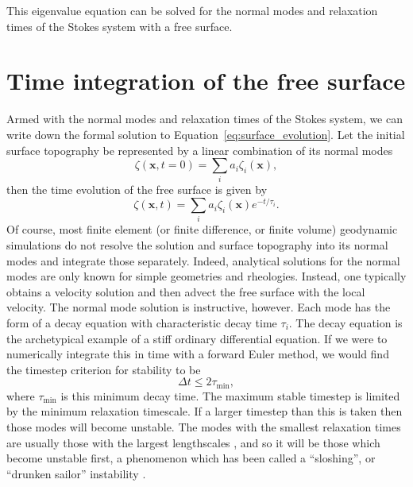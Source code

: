 \documentclass[preprint,12pt,authoryear]{elsarticle}
\begin{document}
This eigenvalue equation can be solved for the normal modes and relaxation times of the Stokes system with 
a free surface.

\section{Time integration of the free surface}
\label{sec:timestepping}

Armed with the normal modes and relaxation times of the Stokes system, we can write down the
formal solution to Equation~\eqref{eq:surface_evolution}. Let the initial surface topography be 
represented by a linear combination of its normal modes
\begin{equation}
\zeta(\mathbf{x}, t=0) = \displaystyle \sum_i a_i \zeta_i(\mathbf{x}),
\end{equation}
then the time evolution of the free surface is given by
\begin{equation}
\zeta( \mathbf{x}, t) = \displaystyle \sum_i a_i \zeta_i(\mathbf{x}) e^{-t/\tau_i}.
\end{equation}
Of course, most finite element (or finite difference, or finite volume) geodynamic simulations do not resolve 
the solution and surface topography into its normal modes and integrate those separately. 
Indeed, analytical solutions for the normal modes are only known for simple geometries and rheologies.
Instead, one typically obtains a velocity solution and then advect the free surface with the local velocity.
The normal mode solution is instructive, however. 
Each mode has the form of a decay equation with characteristic decay time $\tau_i$.
The decay equation is the archetypical example of a stiff ordinary differential equation.
If we were to numerically integrate this in time with a forward Euler method, we would find the 
timestep criterion for stability \citep[e.g.][]{leveque2007finite} to be
\begin{equation}
\Delta t  \le 2 \tau_{\mathrm{min}},
\label{eq:cfl_euler}
\end{equation}
where $\tau_{\mathrm{min}}$ is this minimum decay time.
The maximum stable timestep is limited by the minimum relaxation timescale.
If a larger timestep than this is taken then those modes will become unstable.
The modes with the smallest relaxation times are usually those with the largest lengthscales \citep{schubert2001mantle}, 
and so it will be those which become unstable first, a phenomenon which has been called 
a ``sloshing'', or ``drunken sailor'' instability \citep{kaus2010stabilization}.
\end{document}
